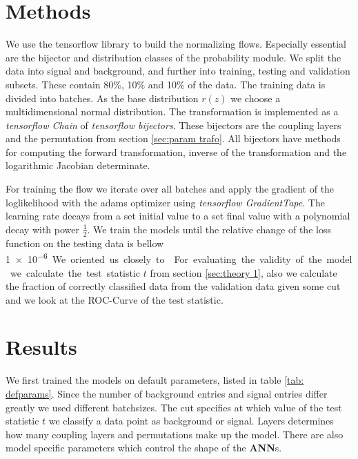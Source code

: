 \documentclass[%
 reprint,
 amsmath,amssymb,
 aps,
]{revtex4-2}
\begin{document}
\section{Methods}
We use the tensorflow library to build the normalizing flows. Especially essential are the bijector and distribution classes of the probability module.
We split the data into signal and background, and further into training, testing and validation subsets.
These contain 80\%, 10\% and 10\% of the data. The training data is divided into batches.
As the base distribution $r(z)$ we choose a multidimensional normal distribution.
The transformation is implemented as a \textit{ tensorflow Chain} of \textit{ tensorflow bijectors}. These bijectors are the coupling layers and the permutation from section \ref{sec:param trafo}.  
All bijectors have methods for computing the forward transformation, inverse of the transformation and the logarithmic Jacobian determinate.

For training the flow we iterate over all batches and apply the gradient of the loglikelihood with the adams optimizer using \textit{tensorflow GradientTape}. The learning rate decays from a set initial value to a set final value with a polynomial decay with power $\frac{1}{2}$.
We train the models until the relative change of the loss function on the testing data is bellow \SI{1e-6}.
We oriented us closely to \cite{LuRi}.

For evaluating the validity of the model we calculate the test statistic $t$ from section \ref{sec:theory 1}, also we calculate the fraction of correctly classified data from the validation data given some cut and we look at the ROC-Curve of the test statistic.

\section{Results}
We first trained the models on default parameters, listed in table \ref{tab: defparams}. Since the number of background entries and signal entries differ greatly we used different batchsizes. The cut specifies at which value of the test statistic $t$ we classify a data point as background or signal. Layers determines how many coupling layers and permutations make up the model. There are also model specific parameters which control the shape of the \textbf{ANN}s.
\end{document}
